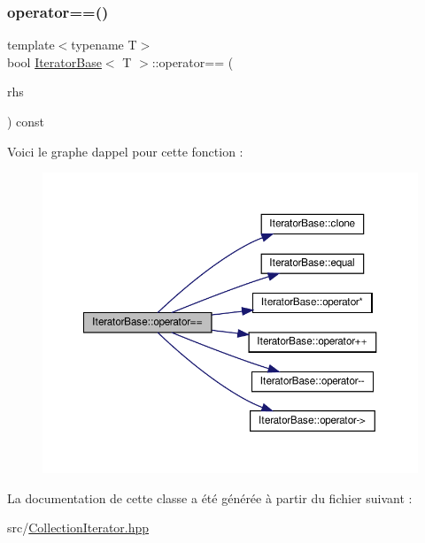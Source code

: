 \subsubsection{\texorpdfstring{operator==()}{operator==()}}
{\footnotesize\ttfamily template$<$typename T$>$ \\
bool \hyperlink{class_iterator_base}{Iterator\+Base}$<$ T $>$\+::operator== (\begin{DoxyParamCaption}\item[{const \hyperlink{class_iterator_base}{Iterator\+Base}$<$ T $>$ \&}]{rhs }\end{DoxyParamCaption}) const\hspace{0.3cm}{\ttfamily [inline]}}

Voici le graphe d\textquotesingle{}appel pour cette fonction \+:
\nopagebreak
\begin{figure}[H]
\begin{center}
\leavevmode
\includegraphics[width=350pt]{class_iterator_base_a7475728422cb73f91d1c4cb4c3d07499_cgraph}
\end{center}
\end{figure}


La documentation de cette classe a été générée à partir du fichier suivant \+:\begin{DoxyCompactItemize}
\item 
src/\hyperlink{_collection_iterator_8hpp}{Collection\+Iterator.\+hpp}\end{DoxyCompactItemize}
